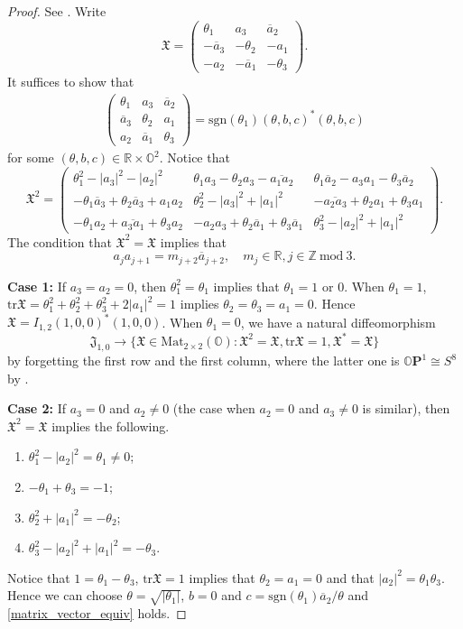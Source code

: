 \documentclass{article}
\newcommand{\isom}{\cong} %
\newcommand{\OO}{\mathbb{O}}
\newcommand{\RR}{\mathbb{R}}
\newcommand{\ZZ}{\mathbb{Z}}
\newcommand{\tr}{\mathrm{tr}}
\newcommand{\FFJ}{\mathfrak{J}}
\newcommand{\FFX}{\mathfrak{X}}
\newcommand{\matiii}[3]{\left(\begin{array}{ccc} #1\\#2\\#3\end{array}\right)}
\theoremstyle{definition}
\begin{document}
\begin{proof}
See \cite[Proposition A.2]{Ruan1}.
\iffalse
Write
$$\FFX=\matiii{\theta_1&a_3&\overline{a}_2}{-\overline{a}_3&-\theta_2&-a_1}{-a_2& -\overline{a}_1&-\theta_3}.$$
It suffices to show that 
\begin{align}\label{matrix_vector_equiv}
\matiii{\theta_1&a_3&\overline{a}_2}{\overline{a}_3&\theta_2&a_1}{a_2&\overline{a}_1&\theta_3}=\mathrm{sgn}(\theta_1)(\theta,b,c)^*(\theta,b,c)
\end{align}
for some $(\theta,b,c)\in\RR\times\OO^2$.
Notice that 
$$\FFX^2=\matiii{\theta_1^2-|a_3|^2-|a_2|^2&\theta_1a_3-\theta_2a_3-\overline{a_1a_2} &\theta_1\overline{a}_2-a_3a_1-\theta_3\overline{a}_2}{-\theta_1\overline{a}_3+\theta_2\overline{a}_3+a_1a_2&\theta_2^2-|a_3|^2+|a_1|^2& -\overline{a_2a_3}+\theta_2a_1+\theta_3a_1}{-\theta_1a_2+\overline{a_3a_1}+\theta_3a_2 & -a_2a_3+\theta_2\overline{a}_1+\theta_3\overline{a}_1&\theta_3^2-|a_2|^2+|a_1|^2 }.$$
The condition that $\FFX^2=\FFX$ implies that 
$$a_ja_{j+1}=m_{j+2}\overline{a}_{j+2},\quad m_j\in\RR,j\in\ZZ\mathrm{~mod~}3.$$


\textbf{Case 1:} If $a_3=a_2=0$, then $\theta_1^2=\theta_1$ implies that $\theta_1=1$ or $0$. When $\theta_1=1$, $\tr\FFX=\theta_1^2+\theta_2^2+\theta_3^2+2|a_1|^2=1$ implies $\theta_2=\theta_3=a_1=0$. Hence $\FFX=I_{1,2}(1,0,0)^*(1,0,0)$. When $\theta_1=0$, we have a natural diffeomorphism
$$\FFJ_{1,0}\to\{\FFX\in\mathrm{Mat}_{2\times 2}(\OO):\FFX^2=\FFX, \tr \FFX=1, \FFX^*=\FFX\}$$
by forgetting the first row and the first column, where the latter one is $\OO\mathbf{P}^1\isom S^8$ by \cite{Baez}.

\textbf{Case 2:} If $a_3=0$ and $a_2\neq 0$ (the case when $a_2=0$ and $a_3\neq 0$ is similar), then $\FFX^2=\FFX$ implies the following.
\begin{enumerate}
\item[(1).] $\theta_1^2-|a_2|^2=\theta_1\neq 0$;
\item[(2).] $-\theta_1+\theta_3=-1$;
\item[(3).] $\theta_2^2+|a_1|^2=-\theta_2$;
\item[(4).] $\theta_3^2-|a_2|^2+|a_1|^2=-\theta_3$.
\end{enumerate}
Notice that $1=\theta_1-\theta_3$, $\tr\FFX=1$ implies that $\theta_2=a_1=0$ and that $|a_2|^2=\theta_1\theta_3$. Hence we can choose $\theta=\sqrt{|\theta_1|}$, $b=0$ and $c=\mathrm{sgn}(\theta_1)\overline{a}_2/\theta$ and \eqref{matrix_vector_equiv} holds.


\end{proof}
\end{document}
